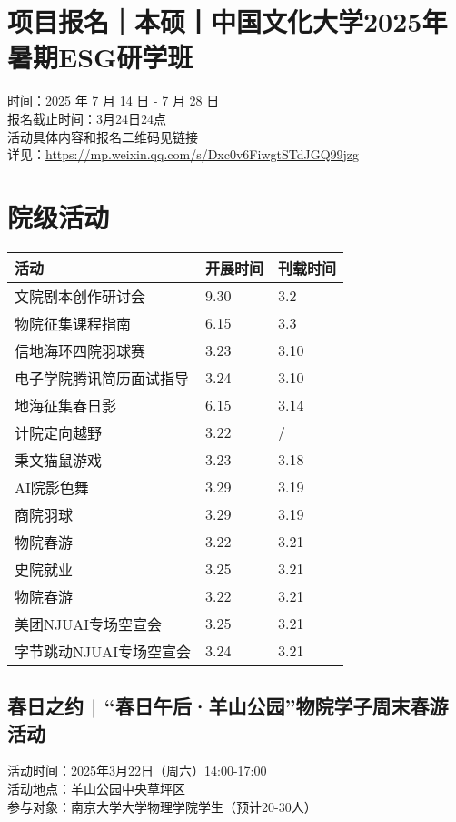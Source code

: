 \documentclass[letterpaper, 12pt]{article}
\begin{document}
\begin{multicols}{2}
\section{项目报名｜本硕丨中国文化大学2025年暑期ESG研学班}
时间：2025 年 7 月 14 日 -  7 月 28 日
\\报名截止时间：3月24日24点
\\活动具体内容和报名二维码见链接
\\详见：\url{https://mp.weixin.qq.com/s/Dxc0v6FiwgtSTdJGQ99jzg}

\section{院级活动}
\begin{tabular}{|>{\centering\arraybackslash}m{}|m{}|m{}|}
\hline
    活动 & 开展时间 & 刊载时间\\
    \hline\hline
    文院剧本创作研讨会 & 9.30 & 3.2\\
    物院征集课程指南 & 6.15 & 3.3\\
    信地海环四院羽球赛 & 3.23 & 3.10\\
    电子学院腾讯简历面试指导 & 3.24 & 3.10\\
    地海征集春日影 & 6.15 & 3.14\\
    计院定向越野 & 3.22 & / \\
    秉文猫鼠游戏 & 3.23 & 3.18\\
    AI院影色舞 & 3.29 & 3.19\\
    商院羽球 & 3.29 & 3.19\\
    物院春游 & 3.22 & 3.21\\
    史院就业 & 3.25 & 3.21\\
    物院春游 & 3.22 & 3.21\\
    美团NJUAI专场空宣会 & 3.25 & 3.21\\\hline
    字节跳动NJUAI专场空宣会 & 3.24 & 3.21\\\hline
    \hline
\end{tabular}
\subsection{春日之约 | “春日午后·羊山公园”物院学子周末春游活动}
活动时间：2025年3月22日（周六）14:00-17:00\\
活动地点：羊山公园中央草坪区\\
参与对象：南京大学大学物理学院学生（预计20-30人）\\


\end{multicols}
\end{document}
